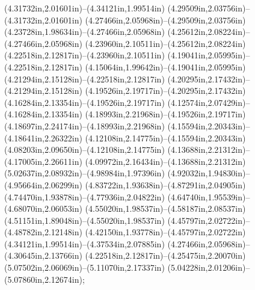 (4.31732in,2.01601in)--(4.34121in,1.99514in) (4.29509in,2.03756in)--(4.31732in,2.01601in) (4.27466in,2.05968in)--(4.29509in,2.03756in) (4.23728in,1.98634in)--(4.27466in,2.05968in) (4.25612in,2.08224in)--(4.27466in,2.05968in) (4.23960in,2.10511in)--(4.25612in,2.08224in) (4.22518in,2.12817in)--(4.23960in,2.10511in) (4.19041in,2.05995in)--(4.22518in,2.12817in) (4.15064in,1.99642in)--(4.19041in,2.05995in) (4.21294in,2.15128in)--(4.22518in,2.12817in) (4.20295in,2.17432in)--(4.21294in,2.15128in) (4.19526in,2.19717in)--(4.20295in,2.17432in) (4.16284in,2.13354in)--(4.19526in,2.19717in) (4.12574in,2.07429in)--(4.16284in,2.13354in) (4.18993in,2.21968in)--(4.19526in,2.19717in) (4.18697in,2.24174in)--(4.18993in,2.21968in) (4.15594in,2.20343in)--(4.18641in,2.26322in) (4.12108in,2.14775in)--(4.15594in,2.20343in) (4.08203in,2.09650in)--(4.12108in,2.14775in) (4.13688in,2.21312in)--(4.17005in,2.26611in) (4.09972in,2.16434in)--(4.13688in,2.21312in) (5.02637in,2.08932in)--(4.98984in,1.97396in) (4.92032in,1.94830in)--(4.95664in,2.06299in) (4.83722in,1.93638in)--(4.87291in,2.04905in) (4.74470in,1.93878in)--(4.77936in,2.04822in) (4.64740in,1.95539in)--(4.68070in,2.06053in) (4.55020in,1.98537in)--(4.58187in,2.08537in) (4.51151in,1.89048in)--(4.55020in,1.98537in) (4.45797in,2.02722in)--(4.48782in,2.12148in) (4.42150in,1.93778in)--(4.45797in,2.02722in) (4.34121in,1.99514in)--(4.37534in,2.07885in) (4.27466in,2.05968in)--(4.30645in,2.13766in) (4.22518in,2.12817in)--(4.25475in,2.20070in) (5.07502in,2.06069in)--(5.11070in,2.17337in) (5.04228in,2.01206in)--(5.07860in,2.12674in);
